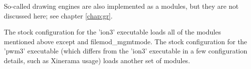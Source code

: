 So-called drawing engines are also implemented as a modules,
but they are not discussed here; see chapter \ref{chap:gr}.

The stock configuration for the 'ion3' executable loads all of the modules
mentioned above except  and file{mod\_mgmtmode}.
The stock configuration for the 'pwm3' executable (which differs from the 
'ion3' executable in a few configuration details, such as Xinerama usage)
loads another set of modules.




